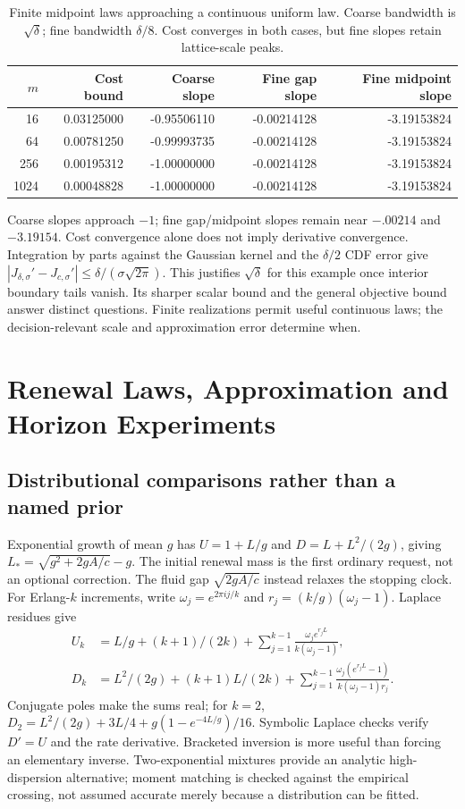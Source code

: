 \documentclass[sigconf,screen,nonacm]{acmart}
\makeatletter
\newcommand{\PaperLatticeTable}{%
\begin{tabular}{@{}rrrrr@{}}\toprule
$m$ & Cost bound & Coarse slope & Fine gap slope & Fine midpoint slope\\\midrule
16 & 0.03125000 & -0.95506110 & -0.00214128 & -3.19153824\\
64 & 0.00781250 & -0.99993735 & -0.00214128 & -3.19153824\\
256 & 0.00195312 & -1.00000000 & -0.00214128 & -3.19153824\\
1024 & 0.00048828 & -1.00000000 & -0.00214128 & -3.19153824\\\bottomrule
\end{tabular}}
\makeatother
\begin{document}
\begin{table}[t]
\centering\small
\caption{Finite midpoint laws approaching a continuous uniform law.
Coarse bandwidth is $\sqrt\delta$; fine bandwidth $\delta/8$. Cost
converges in both cases, but fine slopes retain lattice-scale peaks.}
\label{tab:lattice}\PaperLatticeTable
\end{table}

Coarse slopes approach $-1$; fine gap/midpoint slopes remain near
$-.00214$ and $-3.19154$. Cost convergence alone does not imply derivative
convergence. Integration by parts against the Gaussian kernel and the
$\delta/2$ CDF error give
$|J_{\delta,\sigma}'-J_{c,\sigma}'|\le\delta/(\sigma\sqrt{2\pi})$.
This justifies $\sqrt\delta$ for this example once interior boundary
tails vanish. Its sharper scalar bound and the general objective bound
answer distinct questions. Finite realizations permit useful continuous
laws; the decision-relevant scale and approximation error determine when.

\section{Renewal Laws, Approximation and Horizon Experiments}
\label{app:renewal-experiments}

\subsection{Distributional comparisons rather than a named prior}
Exponential growth of mean $g$ has $U=1+L/g$ and $D=L+L^2/(2g)$,
giving $L_*=\sqrt{g^2+2gA/c}-g$. The initial renewal mass is the first
ordinary request, not an optional correction. The fluid gap
$\sqrt{2gA/c}$ instead relaxes the stopping clock.
For Erlang-$k$ increments, write $\omega_j=e^{2\pi i j/k}$ and
$r_j=(k/g)(\omega_j-1)$. Laplace residues give
\begin{align}
U_k&=L/g+(k+1)/(2k)+\sum_{j=1}^{k-1}
       \frac{\omega_je^{r_jL}}{k(\omega_j-1)},\\
D_k&=L^2/(2g)+(k+1)L/(2k)+\sum_{j=1}^{k-1}
       \frac{\omega_j(e^{r_jL}-1)}{k(\omega_j-1)r_j}.
\end{align}
Conjugate poles make the sums real; for $k=2$,
$D_2=L^2/(2g)+3L/4+g(1-e^{-4L/g})/16$.
Symbolic Laplace checks verify $D'=U$ and the rate derivative.
Bracketed inversion is more useful than forcing an elementary inverse.
Two-exponential mixtures provide an analytic high-dispersion alternative;
moment matching is checked against the empirical crossing, not assumed
accurate merely because a distribution can be fitted.
\end{document}
